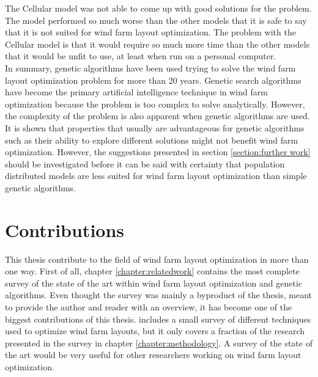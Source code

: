 \noindent The Cellular model was not able to come up with good solutions for the problem. The model performed so much worse than the other models that it is safe to say that it is not suited for wind farm layout optimization. The problem with the Cellular model is that it would require so much more time than the other models that it would be unfit to use, at least when run on a personal computer.\\

\noindent In summary, genetic algorithms have been used trying to solve the wind farm layout optimization problem for more than 20 years. Genetic search algorithms have become the primary artificial intelligence technique in wind farm optimization because the problem is too complex to solve analytically. However, the complexity of the problem is also apparent when genetic algorithms are used. It is shown that properties that usually are advantageous for genetic algorithms such as  their ability to explore different solutions might not benefit wind farm optimization. However, the suggestions presented in section \ref{section:further work} should be investigated before it can be said with certainty that population distributed models are less suited for wind farm layout optimization than simple genetic algorithms.\\


\section{Contributions}\label{section:contributions}
This thesis contribute to the field of wind farm layout optimization in more than one way. First of all, chapter \ref{chapter:relatedwork} contains the most complete survey of the state of the art within wind farm layout optimization and genetic algorithms. Even thought the survey was mainly a byproduct of the thesis, meant to provide the author and reader with an overview, it has become one of the biggest contributions of this thesis. \cite{Samorani} includes a small survey of different techniques used to optimize wind farm layouts, but it only covers a fraction of the research presented in the survey in chapter \ref{chapter:methodology}. A survey of the state of the art would be very useful for other researchers working on wind farm layout optimization.\\

